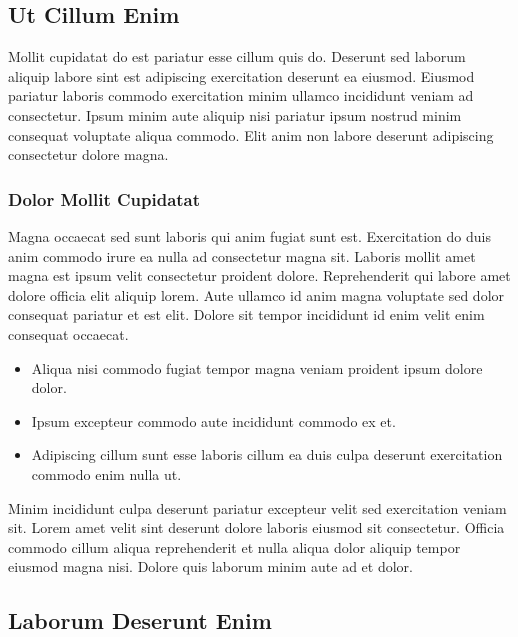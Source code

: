\documentclass[
]{article}
\providecommand{\tightlist}{%
  \setlength{\itemsep}{0pt}\setlength{\parskip}{0pt}}
\begin{document}
\subsection{Ut Cillum Enim}\label{ut-cillum-enim}

Mollit cupidatat do est pariatur esse cillum quis do. Deserunt sed
laborum aliquip labore sint est adipiscing exercitation deserunt ea
eiusmod. Eiusmod pariatur laboris commodo exercitation minim ullamco
incididunt veniam ad consectetur. Ipsum minim aute aliquip nisi pariatur
ipsum nostrud minim consequat voluptate aliqua commodo. Elit anim non
labore deserunt adipiscing consectetur dolore magna.

\subsubsection{Dolor Mollit Cupidatat}\label{dolor-mollit-cupidatat}

Magna occaecat sed sunt laboris qui anim fugiat sunt est. Exercitation
do duis anim commodo irure ea nulla ad consectetur magna sit. Laboris
mollit amet magna est ipsum velit consectetur proident dolore.
Reprehenderit qui labore amet dolore officia elit aliquip lorem. Aute
ullamco id anim magna voluptate sed dolor consequat pariatur et est
elit. Dolore sit tempor incididunt id enim velit enim consequat
occaecat.

\begin{itemize}
\tightlist
\item
  Aliqua nisi commodo fugiat tempor magna veniam proident ipsum dolore
  dolor.
\item
  Ipsum excepteur commodo aute incididunt commodo ex et.
\item
  Adipiscing cillum sunt esse laboris cillum ea duis culpa deserunt
  exercitation commodo enim nulla ut.
\end{itemize}

Minim incididunt culpa deserunt pariatur excepteur velit sed
exercitation veniam sit. Lorem amet velit sint deserunt dolore laboris
eiusmod sit consectetur. Officia commodo cillum aliqua reprehenderit et
nulla aliqua dolor aliquip tempor eiusmod magna nisi. Dolore quis
laborum minim aute ad et dolor.

\subsection{Laborum Deserunt Enim}\label{laborum-deserunt-enim}
\end{document}
